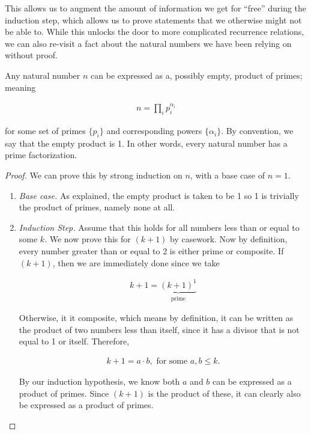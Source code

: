 \documentclass[twoside]{report}
\begin{document}
This allows us to augment the amount of information we get for ``free'' during the induction step, which allows us to prove statements that we otherwise might not be able to. While this unlocks the door to more complicated recurrence relations, we can also re-visit a fact about the natural numbers we have been relying on without proof.

\vspace{\baselineskip}
\begin{theorem}
	Any natural number $n$ can be expressed as a, possibly empty, product of primes; meaning
	
	\begin{align*}
		n = \prod_{i} p_i^{\alpha_i}
	\end{align*}
	
	for some set of primes $\{ p_i \}$ and corresponding powers $\{ \alpha_i \}$. By convention, we say that the empty product is 1. In other words, every natural number has a prime factorization.
\end{theorem}
\begin{proof}
	We can prove this by strong induction on $n$, with a base case of $n = 1$.
	
	\vspace{\baselineskip}
	\begin{enumerate}
		\item \emph{Base case.} As explained, the empty product is taken to be 1 so 1 is trivially the product of primes, namely none at all.
		
		\item \emph{Induction Step.} Assume that this holds for all numbers less than or equal to some $k$. We now prove this for $(k + 1)$ by casework. Now by definition, every number greater than or equal to 2 is either prime or composite. If $(k + 1)$, then we are immediately done since we take
		
		\begin{align*}
			k + 1 = \underbrace{(k + 1)^1}_\text{prime}
		\end{align*}
		
		Otherwise, it it composite, which means by definition, it can be written as the product of two numbers less than itself, since it has a divisor that is not equal to 1 or itself. Therefore,
		
		\begin{align*}
			k + 1 = a \cdot b, \text{ for some } a, b \le k.
		\end{align*}
		
		By our induction hypothesis, we know both $a$ and $b$ can be expressed as a product of primes. Since $(k + 1)$ is the product of these, it can clearly also be expressed as a product of primes.
	\end{enumerate}
\end{proof}
\vspace{\baselineskip}
\end{document}
